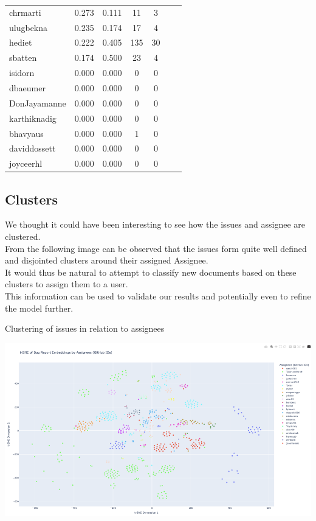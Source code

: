 \documentclass[tikz,10pt,fleqn]{article}
\begin{document}
\begin{table}[H]
\begin{tabular}{@{}lcccccc@{}}
        chrmarti       & 0.273 & 0.111  & 11  & 3   \\
        ulugbekna      & 0.235 & 0.174  & 17  & 4   \\
        hediet         & 0.222 & 0.405  & 135 & 30  \\
        sbatten        & 0.174 & 0.500  & 23  & 4   \\
        isidorn        & 0.000 & 0.000  & 0   & 0   \\
        dbaeumer       & 0.000 & 0.000  & 0   & 0   \\
        DonJayamanne   & 0.000 & 0.000  & 0   & 0   \\
        karthiknadig   & 0.000 & 0.000  & 0   & 0   \\
        bhavyaus       & 0.000 & 0.000  & 1   & 0   \\
        daviddossett   & 0.000 & 0.000  & 0   & 0   \\
        joyceerhl      & 0.000 & 0.000  & 0   & 0   \\ \bottomrule
    \end{tabular}
\end{table}

\subsection*{Clusters}
We thought it could have been interesting to see how the issues and assignee are clustered.\\
From the following image can be observed that the issues form quite well defined and disjointed clusters around their assigned Assignee.\\
It would thus be natural to attempt to classify new documents based on these clusters to assign them to a user.\\
This information can be used to validate our results and potentially even to refine the model further.
\begin{table}[H]
	\centering
	\caption{Clustering of issues in relation to assignees}
	\includegraphics[width=\textwidth]{plot.png}
\end{table}
\end{document}
